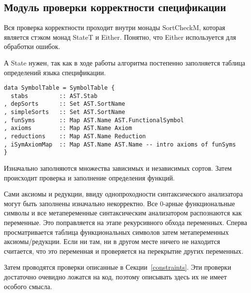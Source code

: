 \subsection{Модуль проверки корректности спецификации}\label{sortcheck}
Вся проверка корректности проходит внутри монады SortCheckM, которая является стэком монад StateT и Either. Понятно, что Either используется для обработки ошибок.

А State нужен, так как в ходе работы алгоритма постепенно заполняется таблица определений языка спецификации.


\begin{lstlisting}[caption={Структура заполняемая модулем проверки спецификации},captionpos=b,frame=single, label={SymTab}]
data SymbolTable = SymbolTable {
  stabs         :: AST.Stab
, depSorts      :: Set AST.SortName
, simpleSorts   :: Set AST.SortName
, funSyms       :: Map AST.Name AST.FunctionalSymbol
, axioms        :: Map AST.Name Axiom
, reductions    :: Map AST.Name Reduction
, iSymAxiomMap  :: Map AST.Name AST.Name -- intro axioms of funSyms
}
\end{lstlisting}


Изначально заполняются множества зависимых и независимых сортов. Затем происходит проверка и заполнение определения функций.

Сами аксиомы и редукции, ввиду однопроходности синтаксического анализатора могут быть заполнены изначально некорректно. Все 0-арные функциональные символы и все метапеременные синтаксическим анализатором распознаются как переменные. Это поправляется на этапе рекурсивного обхода переменных. Сперва просматривается таблица функциональных символов затем метапеременных аксиомы/редукции. Если ни там, ни в другом месте ничего не находится считается, что это переменная и проверяется на перекрытие других переменных.

Затем проводятся проверки описанные в Секции~\ref{constraints}. Эти проверки достаточно очевидно ложатся на код, поэтому описывать здесь их не имеет особого смысла.




















